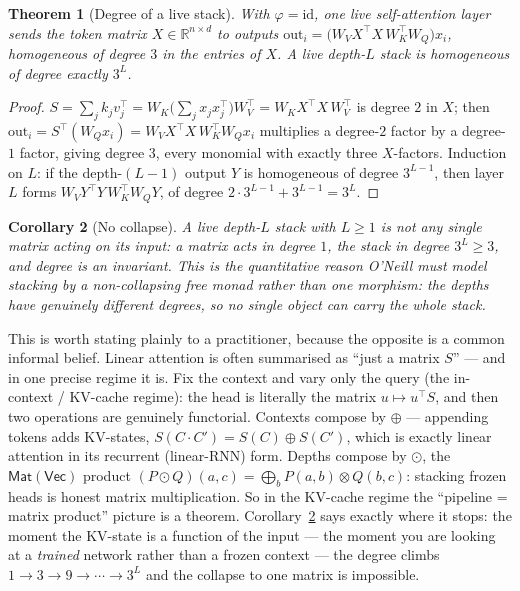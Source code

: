 \documentclass[11pt]{article}
\providecommand{\Vec}{}\renewcommand{\Vec}{\mathsf{Vec}}
\newcommand{\Mat}{\mathsf{Mat}}
\newcommand{\id}{\mathrm{id}}
\newcommand{\out}{\mathrm{out}}
\theoremstyle{plain}
\newtheorem{theorem}{Theorem}
\newtheorem{corollary}[theorem]{Corollary}
\theoremstyle{definition}
\begin{document}
\begin{theorem}[Degree of a live stack]\label{thm:degree}
With $\varphi=\id$, one live self-attention layer sends the token matrix $X\in\mathbb{R}^{n\times d}$ to
outputs $\out_{i}=\bigl(W_{V}X^{\!\top}X\,W_{K}^{\!\top}W_{Q}\bigr)x_{i}$, homogeneous of degree $3$ in the
entries of $X$. A live depth-$L$ stack is homogeneous of degree \emph{exactly} $3^{L}$.
\end{theorem}

\begin{proof}
$S=\sum_{j}k_{j}v_{j}^{\!\top}=W_{K}\bigl(\sum_{j}x_{j}x_{j}^{\!\top}\bigr)W_{V}^{\!\top}=W_{K}X^{\!\top}X\,W_{V}^{\!\top}$
is degree $2$ in $X$; then $\out_{i}=S^{\!\top}(W_{Q}x_{i})=W_{V}X^{\!\top}X\,W_{K}^{\!\top}W_{Q}x_{i}$ multiplies
a degree-$2$ factor by a degree-$1$ factor, giving degree $3$, every monomial with exactly three $X$-factors.
Induction on $L$: if the depth-$(L-1)$ output $Y$ is homogeneous of degree $3^{L-1}$, then layer $L$ forms
$W_{V}Y^{\!\top}Y\,W_{K}^{\!\top}W_{Q}Y$, of degree $2\cdot 3^{L-1}+3^{L-1}=3^{L}$.
\end{proof}

\begin{corollary}[No collapse]\label{cor:nocollapse}
A live depth-$L$ stack with $L\ge 1$ is not any single matrix acting on its input: a matrix acts in degree $1$,
the stack in degree $3^{L}\ge 3$, and degree is an invariant. This is the quantitative reason O'Neill must model
stacking by a non-collapsing free monad rather than one morphism: the depths have genuinely different degrees, so
no single object can carry the whole stack.
\end{corollary}

This is worth stating plainly to a practitioner, because the opposite is a common informal belief. Linear
attention is often summarised as ``just a matrix $S$'' --- and in one precise regime it is. Fix the context and
vary only the query (the in-context / KV-cache regime): the head is literally the matrix $u\mapsto u^{\!\top}S$,
and then two operations are genuinely functorial. Contexts compose by $\oplus$ --- appending tokens adds
KV-states, $S(C\cdot C')=S(C)\oplus S(C')$, which is exactly linear attention in its recurrent (linear-RNN)
form. Depths compose by $\odot$, the $\Mat(\Vec)$ product $(P\odot Q)(a,c)=\bigoplus_{b}P(a,b)\otimes Q(b,c)$:
stacking frozen heads is honest matrix multiplication. So in the KV-cache regime the ``pipeline = matrix product''
picture is a theorem. Corollary~\ref{cor:nocollapse} says exactly where it stops: the moment the KV-state is a
function of the input --- the moment you are looking at a \emph{trained} network rather than a frozen context ---
the degree climbs $1\to 3\to 9\to\cdots\to 3^{L}$ and the collapse to one matrix is impossible.
\end{document}
